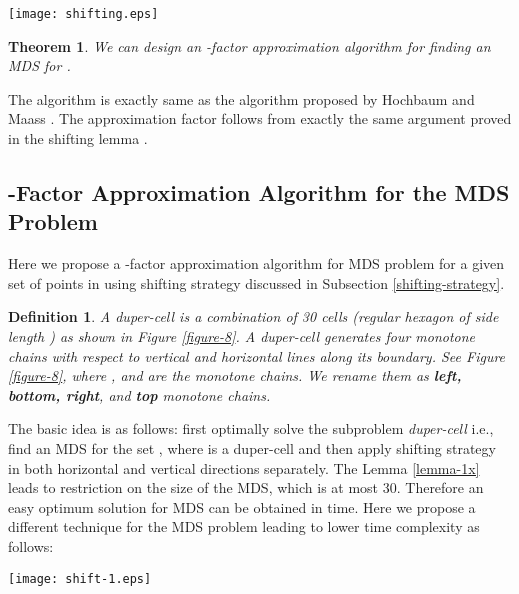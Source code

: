 \documentclass[a4paper,11pt]{article}
\newtheorem{theorem}{Theorem}
\newtheorem{definition}{Definition}
\newenvironment{proof}{\noindent {\bf Proof:\,\ }}{\hfill\mbox{\
}\smallskip}
\begin{document}
\begin{figure*}[!ht]
\begin{center}
\texttt{[image: shifting.eps]}
\end{center} 
\caption{Demonstration of shifting strategy}
\label{shifting}
\end{figure*}

\begin{theorem} \label{shift-factor}
We can design an -factor approximation algorithm for finding an MDS for .
\end{theorem}

\begin{proof}
The algorithm is exactly same as the algorithm proposed by Hochbaum and Maass \cite{HM85}. The approximation factor 
follows from exactly the same argument proved in the shifting lemma \cite{HM85}. 
\end{proof}


\subsection{-Factor Approximation Algorithm for the MDS Problem}
Here we propose a -factor approximation algorithm for MDS problem for a given 
set  of  points in  using shifting strategy discussed in Subsection \ref{shifting-strategy}. 

\begin{definition}
 A {\it duper-cell} is a combination of 30 cells (regular hexagon of side length ) as shown in 
 Figure \ref{figure-8}. A duper-cell  generates four monotone chains with respect to 
 vertical and horizontal lines along its boundary. See Figure \ref{figure-8}, where , and  
 are the monotone chains. We rename them as {\bf left, bottom, right}, and {\bf top} monotone chains.
\end{definition}

The basic idea is as follows: first optimally solve the subproblem {\it duper-cell} i.e., 
find an MDS for the set , where  is a duper-cell and then apply shifting 
strategy in both horizontal and vertical directions separately. The Lemma \ref{lemma-1x} leads 
to restriction on the size of the MDS, which is at most 30. Therefore an easy optimum solution 
for MDS can be obtained in  time. Here we propose a different technique for the MDS problem 
leading to lower time complexity as follows:

\begin{figure*}[!ht]
\begin{center}
\texttt{[image: shift-1.eps]}
\end{center} 
\caption{Demonstration of -factor approximation algorithm}
\label{figure-8}
\end{figure*}
\end{document}

